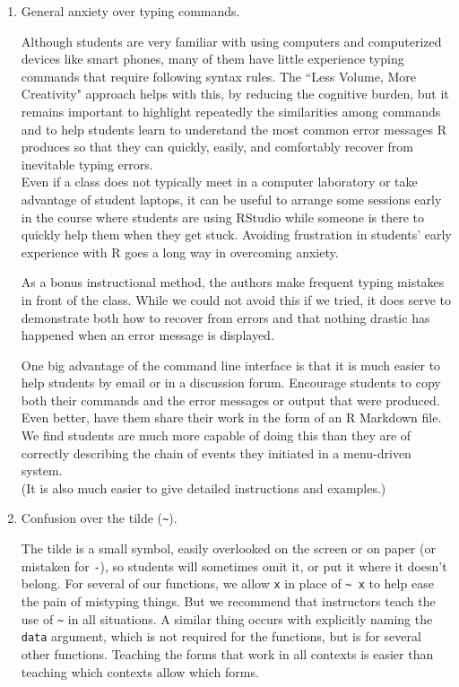 \begin{enumerate}
\def\labelenumi{\arabic{enumi}.}
\item
  General anxiety over typing commands.

  Although students are very familiar with using computers and
  computerized devices like smart phones, many of them have little
  experience typing commands that require following syntax rules. The
  ``Less Volume, More Creativity" approach helps with this, by reducing
  the cognitive burden, but it remains important to highlight repeatedly
  the similarities among commands and to help students learn to
  understand the most common error messages R produces so that they can
  quickly, easily, and comfortably recover from inevitable typing
  errors.\\
  Even if a class does not typically meet in a computer laboratory or
  take advantage of student laptops, it can be useful to arrange some
  sessions early in the course where students are using RStudio while
  someone is there to quickly help them when they get stuck. Avoiding
  frustration in students' early experience with R goes a long way in
  overcoming anxiety.

  As a bonus instructional method, the authors make frequent typing
  mistakes in front of the class. While we could not avoid this if we
  tried, it does serve to demonstrate both how to recover from errors
  and that nothing drastic has happened when an error message is
  displayed.

  One big advantage of the command line interface is that it is much
  easier to help students by email or in a discussion forum. Encourage
  students to copy both their commands and the error messages or output
  that were produced.\\
  Even better, have them share their work in the form of an R Markdown
  file. We find students are much more capable of doing this than they
  are of correctly describing the chain of events they initiated in a
  menu-driven system.\\
  (It is also much easier to give detailed instructions and examples.)
\item
  Confusion over the tilde (\texttt{\textasciitilde{}}).

  The tilde is a small symbol, easily overlooked on the screen or on
  paper (or mistaken for \texttt{-}), so students will sometimes omit
  it, or put it where it doesn't belong. For several of our functions,
  we allow \texttt{x} in place of \texttt{\textasciitilde{}\ x} to help
  ease the pain of mistyping things. But we recommend that instructors
  teach the use of \texttt{\textasciitilde{}} in all situations. A
  similar thing occurs with explicitly naming the \texttt{data}
  argument, which is not required for the  functions, but
  is for several other functions. Teaching the forms that work in all
  contexts is easier than teaching which contexts allow which forms.


\end{enumerate}
